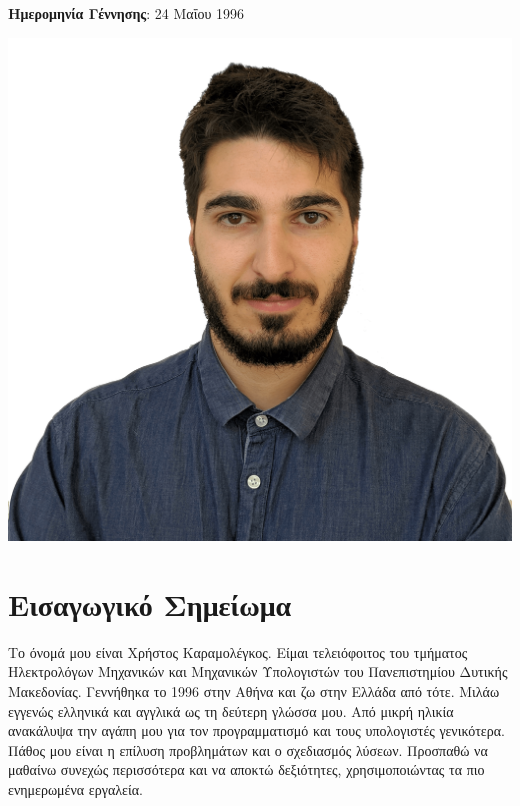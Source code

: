 \documentclass{mycv}
\begin{document}
	\pagestyle{empty}
	\begin{minipage}{.7\textwidth}
		\begin{flushleft}
			\centering
			{\bf Ημερομηνία Γέννησης}: 24 Μαΐου 1996
		\end{flushleft}
	\end{minipage}
	\begin{minipage}{.3\textwidth}
		\begin{flushright}
			\includegraphics[scale=0.05]{../assets/christos.png}
		\end{flushright}
	\end{minipage}
	\vspace*{-0.5cm}
	\section{Εισαγωγικό Σημείωμα}
	\textnormal Το όνομά μου είναι Χρήστος Καραμολέγκος. Είμαι τελειόφοιτος του τμήματος Ηλεκτρολόγων Μηχανικών και Μηχανικών Υπολογιστών του Πανεπιστημίου Δυτικής Μακεδονίας. Γεννήθηκα το 1996 στην Αθήνα και ζω στην Ελλάδα από τότε. Μιλάω εγγενώς ελληνικά και αγγλικά ως τη δεύτερη γλώσσα μου. Από μικρή ηλικία ανακάλυψα την αγάπη μου για τον προγραμματισμό και τους υπολογιστές γενικότερα. Πάθος μου είναι η επίλυση προβλημάτων και ο σχεδιασμός λύσεων. Προσπαθώ να μαθαίνω συνεχώς περισσότερα και να αποκτώ δεξιότητες, χρησιμοποιώντας τα πιο ενημερωμένα εργαλεία.
	
\end{document}
